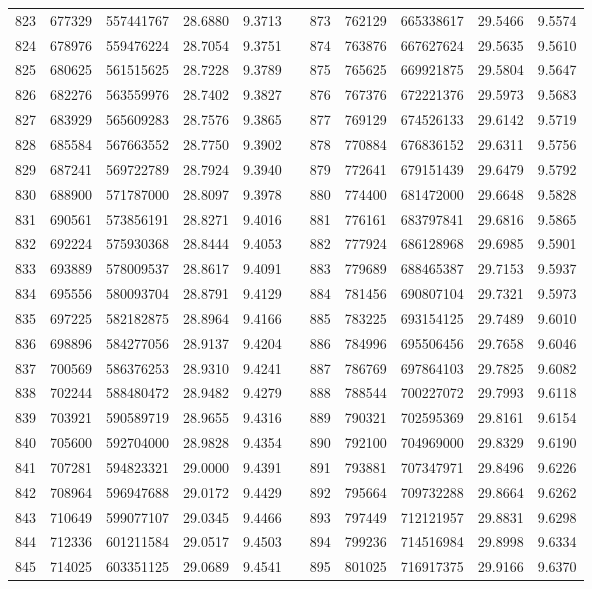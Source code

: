 \begin{longtable}{rrrrrrrrrrr}
823&677329&557441767&28.6880&9.3713&&873&762129&665338617&29.5466&9.5574\\
824&678976&559476224&28.7054&9.3751&&874&763876&667627624&29.5635&9.5610\\
825&680625&561515625&28.7228&9.3789&&875&765625&669921875&29.5804&9.5647\\
826&682276&563559976&28.7402&9.3827&&876&767376&672221376&29.5973&9.5683\\
827&683929&565609283&28.7576&9.3865&&877&769129&674526133&29.6142&9.5719\\
828&685584&567663552&28.7750&9.3902&&878&770884&676836152&29.6311&9.5756\\
829&687241&569722789&28.7924&9.3940&&879&772641&679151439&29.6479&9.5792\\
830&688900&571787000&28.8097&9.3978&&880&774400&681472000&29.6648&9.5828\\
831&690561&573856191&28.8271&9.4016&&881&776161&683797841&29.6816&9.5865\\
832&692224&575930368&28.8444&9.4053&&882&777924&686128968&29.6985&9.5901\\
833&693889&578009537&28.8617&9.4091&&883&779689&688465387&29.7153&9.5937\\
834&695556&580093704&28.8791&9.4129&&884&781456&690807104&29.7321&9.5973\\
835&697225&582182875&28.8964&9.4166&&885&783225&693154125&29.7489&9.6010\\
836&698896&584277056&28.9137&9.4204&&886&784996&695506456&29.7658&9.6046\\
837&700569&586376253&28.9310&9.4241&&887&786769&697864103&29.7825&9.6082\\
838&702244&588480472&28.9482&9.4279&&888&788544&700227072&29.7993&9.6118\\
839&703921&590589719&28.9655&9.4316&&889&790321&702595369&29.8161&9.6154\\
840&705600&592704000&28.9828&9.4354&&890&792100&704969000&29.8329&9.6190\\
841&707281&594823321&29.0000&9.4391&&891&793881&707347971&29.8496&9.6226\\
842&708964&596947688&29.0172&9.4429&&892&795664&709732288&29.8664&9.6262\\
843&710649&599077107&29.0345&9.4466&&893&797449&712121957&29.8831&9.6298\\
844&712336&601211584&29.0517&9.4503&&894&799236&714516984&29.8998&9.6334\\
845&714025&603351125&29.0689&9.4541&&895&801025&716917375&29.9166&9.6370\\

\end{longtable}
